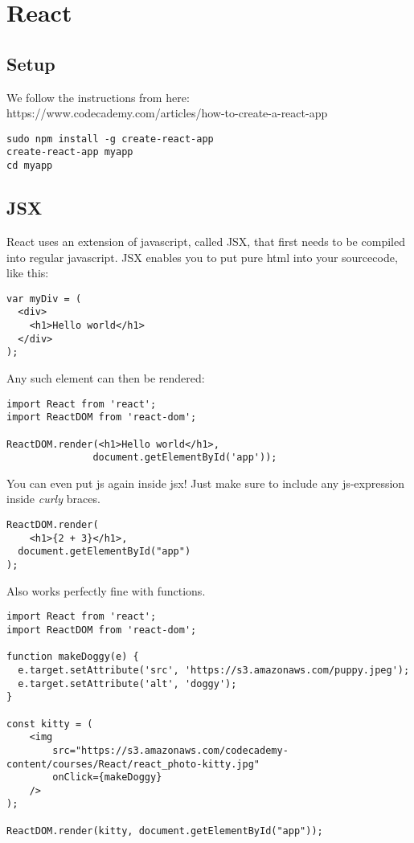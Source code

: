 
\section{React}

\subsection{Setup}
We follow the instructions from here: https://www.codecademy.com/articles/how-to-create-a-react-app
\begin{lstlisting}
sudo npm install -g create-react-app
create-react-app myapp
cd myapp

\end{lstlisting}

\subsection{JSX}

React uses an extension of javascript, called JSX, that first needs to be compiled into regular javascript. JSX enables you to put pure html into your sourcecode, like this: 

\begin{lstlisting}
var myDiv = (
  <div>
    <h1>Hello world</h1>
  </div>
);
\end{lstlisting}

Any such element can then be rendered:
\begin{lstlisting}
import React from 'react';
import ReactDOM from 'react-dom';

ReactDOM.render(<h1>Hello world</h1>, 
               document.getElementById('app'));
\end{lstlisting}

You can even put js again inside jsx! Just make sure to include any js-expression inside \emph{curly} braces. 
\begin{lstlisting}
ReactDOM.render(
	<h1>{2 + 3}</h1>,
  document.getElementById("app")
);
\end{lstlisting}

Also works perfectly fine with functions.
\begin{lstlisting}
import React from 'react';
import ReactDOM from 'react-dom';

function makeDoggy(e) {
  e.target.setAttribute('src', 'https://s3.amazonaws.com/puppy.jpeg');
  e.target.setAttribute('alt', 'doggy');
}

const kitty = (
	<img 
		src="https://s3.amazonaws.com/codecademy-content/courses/React/react_photo-kitty.jpg" 
        onClick={makeDoggy}
    />
);

ReactDOM.render(kitty, document.getElementById("app"));
\end{lstlisting}

